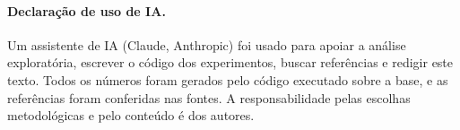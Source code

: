 \documentclass[12pt]{article}
\begin{document}
\paragraph{Declaração de uso de IA.} Um assistente de IA (Claude, Anthropic) foi usado para apoiar a análise
exploratória, escrever o código dos experimentos, buscar referências e redigir este texto. Todos os números foram
gerados pelo código executado sobre a base, e as referências foram conferidas nas fontes. A responsabilidade pelas
escolhas metodológicas e pelo conteúdo é dos autores.



\end{document}
